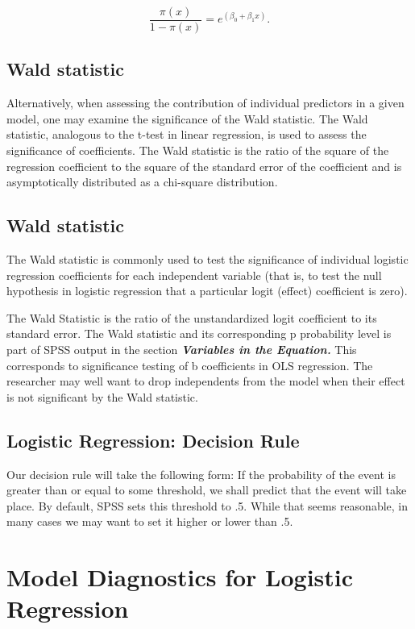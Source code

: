 \documentclass[a4paper,12pt]{article}
\begin{document}
\[\frac{\pi(x)} {1 - \pi(x)} = e^{(\beta_0 + \beta_1 x)}.\]

\subsection{Wald statistic}

Alternatively, when assessing the contribution of individual predictors in a given model, one may examine the significance of the Wald statistic. The Wald statistic, analogous to the t-test in linear regression, is used to assess the significance of coefficients. The Wald statistic is the ratio of the square of the regression coefficient to the square of the standard error of the coefficient and is asymptotically distributed as a chi-square distribution.



\subsection{Wald statistic}
The Wald statistic is commonly used to test the significance of individual logistic regression coefficients for each independent variable (that is, to test the null hypothesis in logistic regression that a particular logit (effect) coefficient is zero). 

The Wald Statistic is the ratio of the unstandardized logit coefficient to its standard error. The Wald statistic and its corresponding p probability level is part of SPSS output in the section \textbf{\textit{Variables in the Equation.}} This corresponds to significance testing of b coefficients in OLS regression. The researcher may well want to drop independents from the model when their effect is not significant by the Wald statistic.
\newpage



\subsection{Logistic Regression: Decision Rule}
Our decision rule will take the following form: If the probability of the event is greater than or equal to some threshold, we shall predict that the event will take place. By default, SPSS sets this threshold to .5. While that seems reasonable, in many cases we may want to set it higher or lower than .5.


\section{Model Diagnostics for Logistic Regression}
\end{document}
